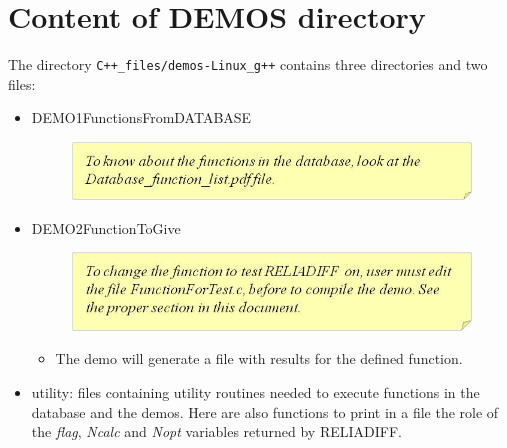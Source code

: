 \documentclass[10pt]{article}
\begin{document}
\section{Content of DEMOS directory}
The directory {\tt C++\_files/demos-Linux\_g++} contains three directories and two files:
\begin{itemize}
	  \item DEMO1\textendash Functions\textendash From\textendash DATABASE

\begin{figure}[!h]
\begin{flushright}

\includegraphics[scale=0.8]{Immagine2}

\end{flushright}
\end{figure}

	  \item DEMO2\textendash Function\textendash To\textendash Give

\begin{figure}[!h]
\begin{flushright}

\includegraphics[scale=0.8]{Immagine3}

\end{flushright}
\end{figure}

		    \begin{itemize}
		      \item The demo will generate a file with results for the defined function.
		    \end{itemize}
	  \item utility: files containing utility routines needed to execute functions in the database and the demos.
	  Here are also functions to print in a file the role of the \emph{flag}, \emph{Ncalc} and \emph{Nopt} variables returned by RELIADIFF.

\begin{figure}[!h]
\begin{flushright}


\end{flushright}
\end{figure}
\end{itemize}
\end{document}
